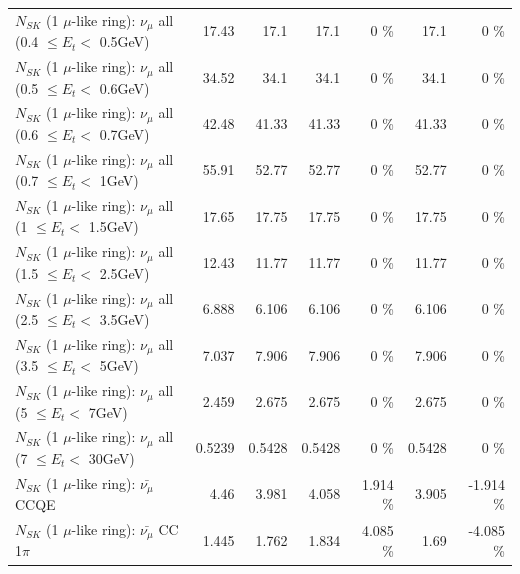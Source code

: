 \begin{table}
\begin{tabular}{| l | r | r | r  r | r  r |}
       $N_{SK}$ (1 $\mu$-like ring): $\nu_{\mu}$ all (0.4 $\leq E_{t} <$ 0.5GeV) &           17.43 &            17.1 &            17.1 &        0 \%  &            17.1 &        0 \%  \\ 
       $N_{SK}$ (1 $\mu$-like ring): $\nu_{\mu}$ all (0.5 $\leq E_{t} <$ 0.6GeV) &           34.52 &            34.1 &            34.1 &        0 \%  &            34.1 &        0 \%  \\ 
       $N_{SK}$ (1 $\mu$-like ring): $\nu_{\mu}$ all (0.6 $\leq E_{t} <$ 0.7GeV) &           42.48 &           41.33 &           41.33 &        0 \%  &           41.33 &        0 \%  \\ 
         $N_{SK}$ (1 $\mu$-like ring): $\nu_{\mu}$ all (0.7 $\leq E_{t} <$ 1GeV) &           55.91 &           52.77 &           52.77 &        0 \%  &           52.77 &        0 \%  \\ 
         $N_{SK}$ (1 $\mu$-like ring): $\nu_{\mu}$ all (1 $\leq E_{t} <$ 1.5GeV) &           17.65 &           17.75 &           17.75 &        0 \%  &           17.75 &        0 \%  \\ 
       $N_{SK}$ (1 $\mu$-like ring): $\nu_{\mu}$ all (1.5 $\leq E_{t} <$ 2.5GeV) &           12.43 &           11.77 &           11.77 &        0 \%  &           11.77 &        0 \%  \\ 
       $N_{SK}$ (1 $\mu$-like ring): $\nu_{\mu}$ all (2.5 $\leq E_{t} <$ 3.5GeV) &           6.888 &           6.106 &           6.106 &        0 \%  &           6.106 &        0 \%  \\ 
         $N_{SK}$ (1 $\mu$-like ring): $\nu_{\mu}$ all (3.5 $\leq E_{t} <$ 5GeV) &           7.037 &           7.906 &           7.906 &        0 \%  &           7.906 &        0 \%  \\ 
           $N_{SK}$ (1 $\mu$-like ring): $\nu_{\mu}$ all (5 $\leq E_{t} <$ 7GeV) &           2.459 &           2.675 &           2.675 &        0 \%  &           2.675 &        0 \%  \\ 
          $N_{SK}$ (1 $\mu$-like ring): $\nu_{\mu}$ all (7 $\leq E_{t} <$ 30GeV) &          0.5239 &          0.5428 &          0.5428 &        0 \%  &          0.5428 &        0 \%  \\ 
\hline
\hline
\hline
                              $N_{SK}$ (1 $\mu$-like ring): $\bar{\nu_\mu}$ CCQE &            4.46 &           3.981 &           4.058 &    1.914 \%  &           3.905 &   -1.914 \%  \\ 
                         $N_{SK}$ (1 $\mu$-like ring): $\bar{\nu_\mu}$ CC 1$\pi$ &           1.445 &           1.762 &           1.834 &    4.085 \%  &            1.69 &   -4.085 \%  \\ 

\end{tabular}
\end{table}
